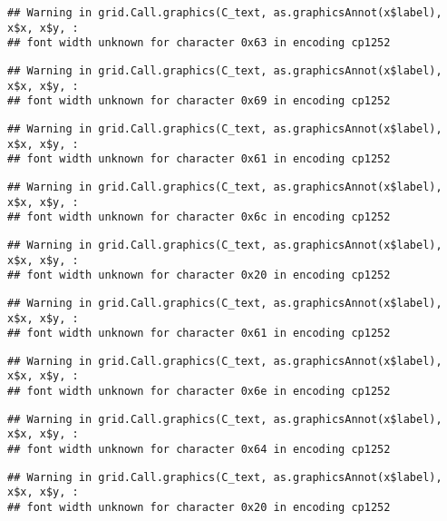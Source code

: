\documentclass[
]{article}
\begin{document}
\begin{verbatim}
## Warning in grid.Call.graphics(C_text, as.graphicsAnnot(x$label), x$x, x$y, :
## font width unknown for character 0x63 in encoding cp1252
\end{verbatim}

\begin{verbatim}
## Warning in grid.Call.graphics(C_text, as.graphicsAnnot(x$label), x$x, x$y, :
## font width unknown for character 0x69 in encoding cp1252
\end{verbatim}

\begin{verbatim}
## Warning in grid.Call.graphics(C_text, as.graphicsAnnot(x$label), x$x, x$y, :
## font width unknown for character 0x61 in encoding cp1252
\end{verbatim}

\begin{verbatim}
## Warning in grid.Call.graphics(C_text, as.graphicsAnnot(x$label), x$x, x$y, :
## font width unknown for character 0x6c in encoding cp1252
\end{verbatim}

\begin{verbatim}
## Warning in grid.Call.graphics(C_text, as.graphicsAnnot(x$label), x$x, x$y, :
## font width unknown for character 0x20 in encoding cp1252
\end{verbatim}

\begin{verbatim}
## Warning in grid.Call.graphics(C_text, as.graphicsAnnot(x$label), x$x, x$y, :
## font width unknown for character 0x61 in encoding cp1252
\end{verbatim}

\begin{verbatim}
## Warning in grid.Call.graphics(C_text, as.graphicsAnnot(x$label), x$x, x$y, :
## font width unknown for character 0x6e in encoding cp1252
\end{verbatim}

\begin{verbatim}
## Warning in grid.Call.graphics(C_text, as.graphicsAnnot(x$label), x$x, x$y, :
## font width unknown for character 0x64 in encoding cp1252
\end{verbatim}

\begin{verbatim}
## Warning in grid.Call.graphics(C_text, as.graphicsAnnot(x$label), x$x, x$y, :
## font width unknown for character 0x20 in encoding cp1252
\end{verbatim}
\end{document}
